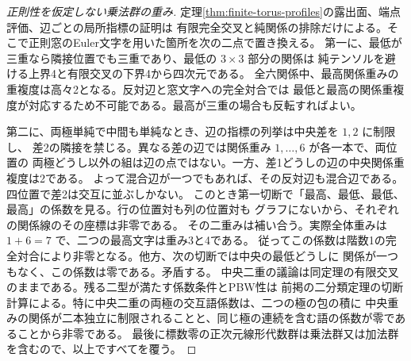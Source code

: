 \begin{proof}[正則性を仮定しない乗法群の重み]
定理\ref{thm:finite-torus-profiles}の露出面、端点評価、辺ごとの局所指標の証明は
有限完全交叉と純関係の排除だけによる。そこで正則窓のEuler文字を用いた箇所を次の二点で置き換える。
第一に、最低が三重なら隣接位置でも三重であり、最低の $3\times3$ 部分の関係は
純テンソルを避ける上界4と有限交叉の下界4から四次元である。
全六関係中、最高関係重みの重複度は高々2となる。反対辺と窓文字への完全対合では
最低と最高の関係重複度が対応するため不可能である。最高が三重の場合も反転すればよい。

第二に、両極単純で中間も単純なとき、辺の指標の列挙は中央差を $1,2$ に制限し、
差2の隣接を禁じる。異なる差の辺では関係重み $1,\ldots,6$ が各一本で、両位置の
両極どうし以外の組は辺の点ではない。一方、差1どうしの辺の中央関係重複度は2である。
よって混合辺が一つでもあれば、その反対辺も混合辺である。四位置で差2は交互に並ぶしかない。
このとき第一切断で「最高、最低、最低、最高」の係数を見る。行の位置対も列の位置対も
グラフにないから、それぞれの関係線のその座標は非零である。
その二重みは補い合う。実際全体重みは $1+6=7$ で、二つの最高文字は重み3と4である。
従ってこの係数は階数1の完全対合により非零となる。他方、次の切断では中央の最低どうしに
関係が一つもなく、この係数は零である。矛盾する。
中央二重の議論は同定理の有限交叉のままである。残る二型が満たす係数条件とPBW性は
前掲の二分類定理の切断計算による。特に中央二重の両極の交互語係数は、二つの極の包の積に
中央重みの関係が二本独立に制限されることと、同じ極の連続を含む語の係数が零であることから非零である。
最後に標数零の正次元線形代数群は乗法群又は加法群を含むので、以上ですべてを覆う。
\end{proof}
